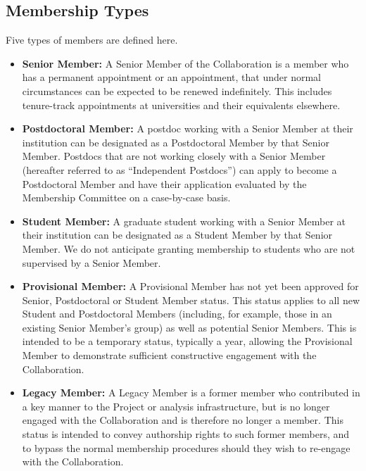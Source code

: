 \documentclass[12pt]{article}
\begin{document}
\subsection{Membership Types}
\label{sec:memtypes}
Five types of members are defined here.  
\begin{itemize}

\item {\bf Senior Member:} A Senior Member of the Collaboration is a member who has a permanent appointment or an appointment, that under normal circumstances can be expected to be renewed indefinitely.   This includes tenure-track appointments at universities and their equivalents elsewhere.  

\item {\bf Postdoctoral Member:}
A postdoc working with a Senior Member at their institution can be designated as a Postdoctoral Member by that Senior Member. Postdocs that are not working closely with a Senior Member (hereafter referred to as ``Independent Postdocs'') can apply to become a Postdoctoral Member and have their application evaluated by the Membership Committee on a case-by-case basis.



\item {\bf Student Member:} A graduate student working with a Senior Member at their institution can be designated as a Student Member by that Senior Member.  We do not anticipate granting membership to students who are not supervised by a Senior Member.


\item {\bf Provisional Member:}  A Provisional Member has not yet been approved for
Senior, Postdoctoral or Student Member status.  This status applies to all new Student and Postdoctoral Members
(including, for example, those in an existing Senior Member's group) as well as potential Senior Members.  This is intended to be a temporary status, typically a year, allowing the Provisional Member to demonstrate
sufficient constructive engagement with the Collaboration.


\item {\bf Legacy Member:}  A Legacy Member is a former member who contributed in a key manner to the Project or analysis infrastructure, but is no longer engaged with the Collaboration and is therefore no longer a member.  This status is intended to convey authorship rights to such former members, and to bypass the normal membership procedures should they wish to re-engage with the Collaboration.


\end{itemize}
\end{document}
